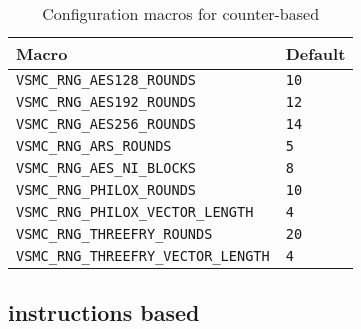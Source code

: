\begin{table}
  \begin{tabularx}{\textwidth}{XX}
    \toprule
    Macro & Default \\
    \midrule
    \verb|VSMC_RNG_AES128_ROUNDS|          & \verb|10| \\
    \verb|VSMC_RNG_AES192_ROUNDS|          & \verb|12| \\
    \verb|VSMC_RNG_AES256_ROUNDS|          & \verb|14| \\
    \verb|VSMC_RNG_ARS_ROUNDS|             & \verb|5|  \\
    \verb|VSMC_RNG_AES_NI_BLOCKS|          & \verb|8|  \\
    \verb|VSMC_RNG_PHILOX_ROUNDS|          & \verb|10| \\
    \verb|VSMC_RNG_PHILOX_VECTOR_LENGTH|   & \verb|4|  \\
    \verb|VSMC_RNG_THREEFRY_ROUNDS|        & \verb|20| \\
    \verb|VSMC_RNG_THREEFRY_VECTOR_LENGTH| & \verb|4|  \\
    \bottomrule
  \end{tabularx}
  \caption{Configuration macros for counter-based \protect\rng}
  \label{tab:Configuration macros for counter-based RNG}
\end{table}

\subsection{\protect\aesni instructions based \protect\rng}
\label{sub:AES-NI instructions based RNG}

